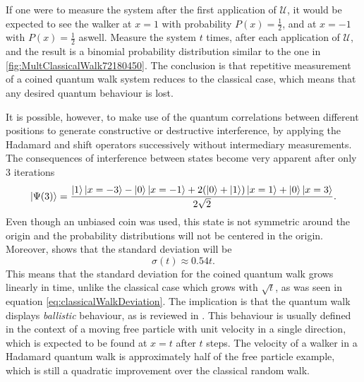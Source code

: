 \documentclass[../../dissertation.tex]{subfiles}
\begin{document}
If one were to measure the system after the first application of $\mathcal{U}$, it would be expected to see the walker at $x=1$ with probability $P(x) = \frac{1}{2}$, and at $x=-1$ with $P(x) = \frac{1}{2}$ aswell. Measure the system $t$ times, after each application of $\mathcal{U}$, and the result is a binomial probability distribution similar to the one in \ref{fig:MultClassicalWalk72180450}. The conclusion is that repetitive measurement of a coined quantum walk system reduces to the classical case, which means that any desired quantum behaviour is lost. \par
It is possible, however, to make use of the quantum correlations between different positions to generate constructive or destructive interference, by applying the Hadamard and shift operators successively without intermediary measurements.
The consequences of interference between states become very apparent after only 3 iterations 
\begin{equation}
	\ket{\Psi(3)} = \frac{\ket{1}\ket{x=-3}-\ket{0}\ket{x=-1}+2(\ket{0}+\ket{1})\ket{x=1}+\ket{0}\ket{x=3}}{2\sqrt{2}}\label{eq:12}.
\end{equation}
Even though an unbiased coin was used, this state is not symmetric around the origin and the probability distributions will not be centered in the origin. Moreover, \cite{REN1} shows that the standard deviation will be
\begin{equation}
	\sigma(t) \approx 0.54t .
\end{equation}
This means that the standard deviation for the coined quantum walk grows linearly in time, unlike the classical case which grows with $\sqrt{t}$, as was seen in equation \ref{eq:classicalWalkDeviation}. The implication is that the quantum walk displays \textit{ballistic} behaviour, as is reviewed in \cite{andraca2012}. This behaviour is usually defined in the context of a moving free particle with unit velocity in a single direction, which is expected to be found at $x=t$ after $t$ steps. The velocity of a walker in a Hadamard quantum walk is approximately half of the free particle example, which is still a quadratic improvement over the classical random walk.\par
\end{document}
